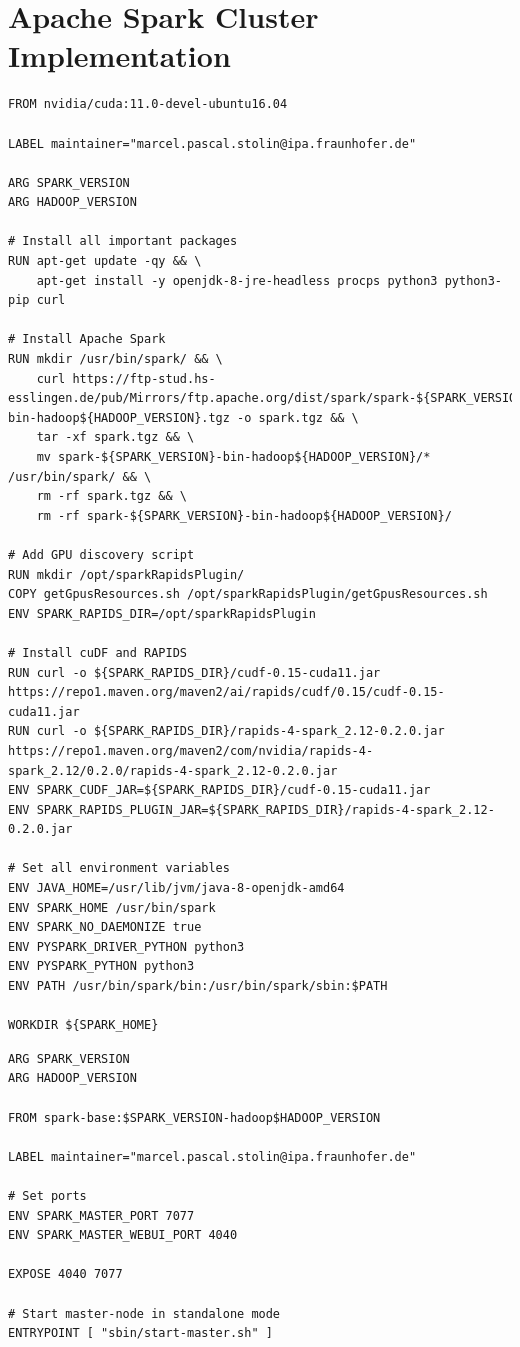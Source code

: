 \chapter{Apache Spark Cluster Implementation}
\begin{lstlisting}[label=lst:appendix_spark_base_dockerfile, caption=Apache Spark base image Dockerfile]
FROM nvidia/cuda:11.0-devel-ubuntu16.04
 
LABEL maintainer="marcel.pascal.stolin@ipa.fraunhofer.de"
 
ARG SPARK_VERSION
ARG HADOOP_VERSION
 
# Install all important packages
RUN apt-get update -qy && \
    apt-get install -y openjdk-8-jre-headless procps python3 python3-pip curl
 
# Install Apache Spark
RUN mkdir /usr/bin/spark/ && \
    curl https://ftp-stud.hs-esslingen.de/pub/Mirrors/ftp.apache.org/dist/spark/spark-${SPARK_VERSION}/spark-${SPARK_VERSION}-bin-hadoop${HADOOP_VERSION}.tgz -o spark.tgz && \
    tar -xf spark.tgz && \
    mv spark-${SPARK_VERSION}-bin-hadoop${HADOOP_VERSION}/* /usr/bin/spark/ && \
    rm -rf spark.tgz && \
    rm -rf spark-${SPARK_VERSION}-bin-hadoop${HADOOP_VERSION}/
 
# Add GPU discovery script
RUN mkdir /opt/sparkRapidsPlugin/
COPY getGpusResources.sh /opt/sparkRapidsPlugin/getGpusResources.sh
ENV SPARK_RAPIDS_DIR=/opt/sparkRapidsPlugin
 
# Install cuDF and RAPIDS
RUN curl -o ${SPARK_RAPIDS_DIR}/cudf-0.15-cuda11.jar https://repo1.maven.org/maven2/ai/rapids/cudf/0.15/cudf-0.15-cuda11.jar
RUN curl -o ${SPARK_RAPIDS_DIR}/rapids-4-spark_2.12-0.2.0.jar https://repo1.maven.org/maven2/com/nvidia/rapids-4-spark_2.12/0.2.0/rapids-4-spark_2.12-0.2.0.jar
ENV SPARK_CUDF_JAR=${SPARK_RAPIDS_DIR}/cudf-0.15-cuda11.jar
ENV SPARK_RAPIDS_PLUGIN_JAR=${SPARK_RAPIDS_DIR}/rapids-4-spark_2.12-0.2.0.jar
 
# Set all environment variables
ENV JAVA_HOME=/usr/lib/jvm/java-8-openjdk-amd64
ENV SPARK_HOME /usr/bin/spark
ENV SPARK_NO_DAEMONIZE true
ENV PYSPARK_DRIVER_PYTHON python3
ENV PYSPARK_PYTHON python3
ENV PATH /usr/bin/spark/bin:/usr/bin/spark/sbin:$PATH
 
WORKDIR ${SPARK_HOME}
\end{lstlisting}

\begin{lstlisting}[label=lst:appendix_spark_master_dockerfile, caption=Apache Spark master image Dockerfile]
ARG SPARK_VERSION
ARG HADOOP_VERSION
 
FROM spark-base:$SPARK_VERSION-hadoop$HADOOP_VERSION
 
LABEL maintainer="marcel.pascal.stolin@ipa.fraunhofer.de"
 
# Set ports
ENV SPARK_MASTER_PORT 7077
ENV SPARK_MASTER_WEBUI_PORT 4040
 
EXPOSE 4040 7077
 
# Start master-node in standalone mode
ENTRYPOINT [ "sbin/start-master.sh" ]
\end{lstlisting}

